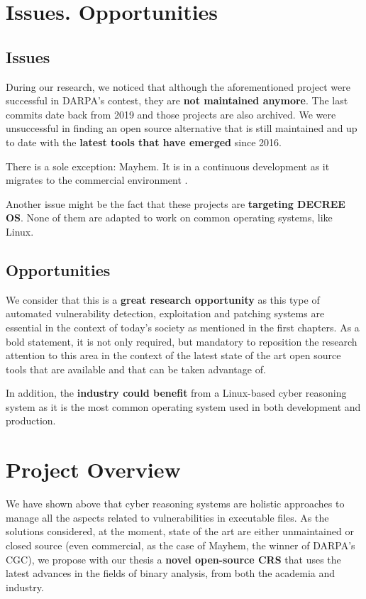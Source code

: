 \documentclass[12pt,a4paper,english,onecolumn]{IEEEtran}
\begin{document}
\section{Issues. Opportunities}

\subsection{Issues}

During our research, we noticed that although the aforementioned project were successful in DARPA's contest, they are \textbf{not maintained anymore}. The last commits date back from 2019 and those projects are also archived. We were unsuccessful in finding an open source alternative that is still maintained and up to date with the \textbf{latest tools that have emerged} since 2016.

There is a sole exception: Mayhem. It is in a continuous development as it migrates to the commercial environment \cite{mayhem_code}.

Another issue might be the fact that these projects are \textbf{targeting DECREE OS}. None of them are adapted to work on common operating systems, like Linux.

\subsection{Opportunities}

We consider that this is a \textbf{great research opportunity} as this type of automated vulnerability detection, exploitation and patching systems are essential in the context of today's society as mentioned in the first chapters. As a bold statement, it is not only required, but mandatory to reposition the research attention to this area in the context of the latest state of the art open source tools that are available and that can be taken advantage of.

In addition, the \textbf{industry could benefit} from a Linux-based cyber reasoning system as it is the most common operating system used in both development and production.

\section{Project Overview}

We have shown above that cyber reasoning systems are holistic approaches to manage all the aspects related to vulnerabilities in executable files. As the solutions considered, at the moment, state of the art are either unmaintained or closed source (even commercial, as the case of Mayhem, the winner of DARPA's CGC), we propose with our thesis a \textbf{novel open-source CRS} that uses the latest advances in the fields of binary analysis, from both the academia and industry.
\end{document}
